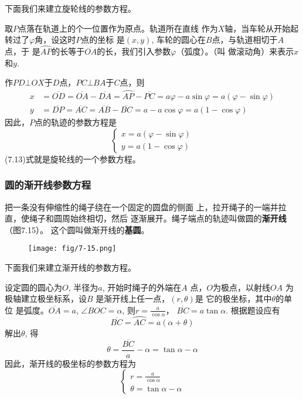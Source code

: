 下面我们来建立旋轮线的参数方程。

取$P$点落在轨道上的个一位置作为原点。轨道所在直线
作为$X$轴，当车轮从开始起转过了$\varphi$角，设这时$P$点的坐标
是$(x,y)$, 车轮的圆心在$B$点，与轨道相切于$A$点，于
是$\wideparen{AP}$的长等于$\overline{OA}$的长，我们引入参数$\varphi$（弧度）。（叫
做滚动角）来表示$x$和$y$.

作$PD\bot OX$于$D$点，$PC\bot BA$于$C$点，则
\[\begin{split}
    x&=\overline{OD}=\overline{OA}-\overline{DA}=\wideparen{AP}-\overline{PC}=a\varphi-a\sin\varphi=a(\varphi-\sin\varphi)\\
    y&=\overline{DP}=\overline{AC}=\overline{AB}-\overline{BC}=a -a\cos\varphi=a(1-\cos\varphi)
\end{split}\]
因此，$P$点的轨迹的参数方程是
\begin{equation}
    \begin{cases}
        x=a(\varphi-\sin\varphi)\\
        y=a(1-\cos\varphi)
    \end{cases}
\end{equation}
(7.13)式就是旋轮线的一个参数方程。

\subsubsection{圆的渐开线参数方程}

把一条没有伸缩性的绳子绕在一个固定的圆盘的侧面
上，拉开绳子的一端并拉直，使绳子和圆周始终相切，然后
逐渐展开。绳子端点的轨迹叫做圆的\textbf{渐开线}（图7.15）。
这个圆叫做渐开线的\textbf{基圆}。
\begin{figure}[htp]
    \centering
\texttt{[image: fig/7-15.png]}
    \caption{}
\end{figure}

下面我们来建立渐开线的参数方程。

设定圆的圆心为$O$, 半径为$a$, 开始时绳子的外端在$A$
点，$O$为极点，以射线$OA$
为极轴建立极坐标系，设$B$
是渐开线上任一点，$(r,\theta)$是
它的极坐标，其中$\theta$的单位
是弧度。$\overline{OA}=a$, 
$\angle BOC=\alpha$, 则$r=\frac{a}{\cos\alpha}$，
$\overline{BC}=a\tan\alpha$. 根据题设应有
\[\overline{BC}=\wideparen{AC}=a(\alpha+\theta)\]
解出$\theta$, 得
\[\theta=\frac{\overline{BC}}{a}-\alpha=\tan\alpha-\alpha\]
因此，渐开线的极坐标的参数方程为
\begin{equation}
    \begin{cases}
        r=\frac{a}{\cos\alpha}\\
    \theta=\tan\alpha-\alpha
    \end{cases}
\end{equation}

